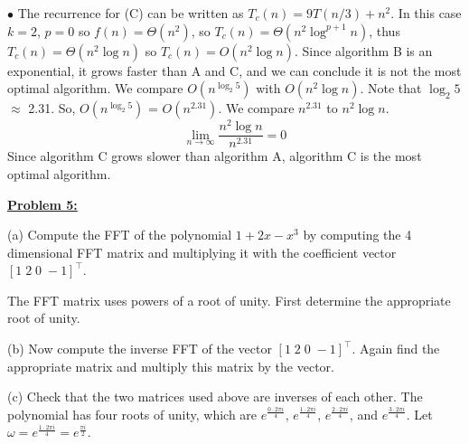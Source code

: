 \documentclass[11pt]{article}
\begin{document}
\begin{flushleft}
		$\bullet$ The recurrence for (C) can be written as $T_c(n) = 9T(n/3) + n^2$. In this case $k = 2$, $p = 0$ so $f(n) = \Theta(n^2)$, so $T_c(n) = \Theta(n^2 \log^{p + 1} n)$, thus $T_c(n) = \Theta(n^2 \log n)$ so $T_c(n) = O(n^2 \log n)$. 
		\newline
		\newline
		Since algorithm B is an exponential, it grows faster than A and C, and we can conclude it is not the most optimal algorithm. We compare $O(n^{\log_2 5})$ with $O(n^2 \log n)$. Note that $\log_2 5$ $\approx$ 2.31. So, $O(n^{\log_2 5})$ = $O(n^{2.31})$. We compare $n^{2.31}$ to $n^2\log n$. $$\lim_{n\to\infty} \frac{n^2 \log n}{n^{2.31}} = 0$$ Since algorithm C grows slower than algorithm A, algorithm C is the most optimal algorithm. 
		
		\item \textbf {\underline{Problem 5:}}

		\item
		(a) Compute the FFT of the polynomial $1+2x-x^3$ by computing
		the 4 dimensional FFT matrix and multiplying it with the
		coefficient vector $[1\; 2\; 0\; -\!1]^\top$.
		
		The FFT matrix uses powers of a root of unity.
		First determine the appropriate root of unity.
		\item
		(b) Now compute the inverse FFT of the vector $[1\; 2\; 0\; -\!1]^\top$.
		Again find the appropriate matrix and multiply this matrix
		by the vector.
		\item
		(c) Check that the two matrices used above are inverses of each
		other.
		\newline\newline
		The polynomial has four roots of unity, which are $e^{\frac{0 \cdot 2\pi i}{4}}$, $e^{\frac{1 \cdot 2\pi i}{4}}$, $e^{\frac{2 \cdot 2\pi i}{4}}$, and $e^{\frac{3 \cdot 2\pi i}{4}}$. Let $\omega = e^{\frac{1 \cdot 2\pi i}{4}} = e^{\frac{\pi i}{2}}$. 
		

\end{flushleft}
\end{document}
